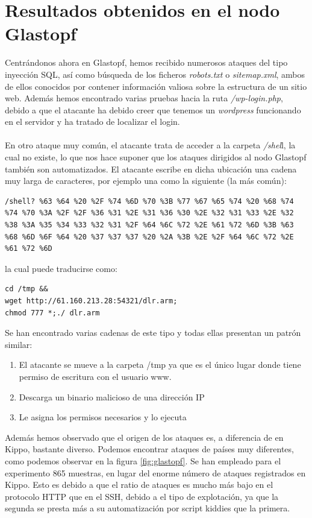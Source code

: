 \documentclass[journal]{IEEEtran}
\begin{document}
\section{Resultados obtenidos en el nodo Glastopf}
Centrándonos ahora en Glastopf, hemos recibido numerosos ataques del tipo inyección SQL, así como búsqueda de los ficheros \textit{robots.txt} o \textit{sitemap.xml}, ambos de ellos conocidos por contener información valiosa sobre la estructura de un sitio web. Además hemos encontrado varias pruebas hacia la ruta \textit{/wp-login.php}, debido a que el atacante ha debido creer que tenemos un \textit{wordpress} funcionando en el servidor y ha tratado de localizar el login.
\\\\
En otro ataque muy común, el atacante trata de acceder a la carpeta \textit{/shel}l, la cual no existe, lo que nos hace suponer que los ataques dirigidos al nodo Glastopf también son automatizados. El atacante escribe en dicha ubicación una cadena muy larga de caracteres, por ejemplo una como la siguiente (la más común):
\begin{lstlisting}
/shell? %63 %64 %20 %2F %74 %6D %70 %3B %77 %67 %65 %74 %20 %68 %74 %74 %70 %3A %2F %2F %36 %31 %2E %31 %36 %30 %2E %32 %31 %33 %2E %32 %38 %3A %35 %34 %33 %32 %31 %2F %64 %6C %72 %2E %61 %72 %6D %3B %63 %68 %6D %6F %64 %20 %37 %37 %37 %20 %2A %3B %2E %2F %64 %6C %72 %2E %61 %72 %6D
\end{lstlisting}
la cual puede traducirse como:
\lstset{breaklines=true}
\begin{lstlisting}
cd /tmp &&
wget http://61.160.213.28:54321/dlr.arm;
chmod 777 *;./ dlr.arm
\end{lstlisting}
Se han encontrado varias cadenas de este tipo y todas ellas presentan un patrón similar:
\begin{enumerate}
\item El atacante se mueve a la carpeta /tmp ya que es el único lugar donde tiene permiso de escritura con el usuario www.
\item Descarga un binario malicioso de una dirección IP
\item Le asigna los permisos necesarios y lo ejecuta
\end{enumerate}
Además hemos observado que el origen de los ataques es, a diferencia de en Kippo, bastante diverso. Podemos encontrar ataques de países muy diferentes, como podemos observar en la figura \ref{fig:glastopf}. Se han empleado para el experimento 865 muestras, en lugar del enorme número de ataques registrados en Kippo. Esto es debido a que el ratio de ataques es mucho más bajo en el protocolo HTTP que en el SSH, debido a el tipo de explotación, ya que la segunda se presta más a su automatización por script kiddies que la primera.
\end{document}
